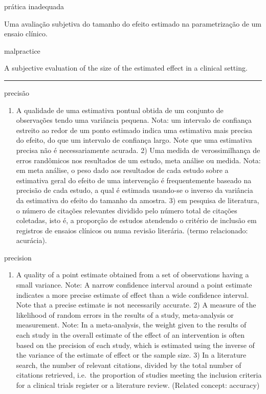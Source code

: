 \documentclass[
  openany]{book}
\providecommand{\tightlist}{%
  \setlength{\itemsep}{0pt}\setlength{\parskip}{0pt}}
\begin{document}
prática inadequada

Uma avaliação subjetiva do tamanho do efeito estimado na parametrização de um ensaio clínico.

malpractice

A subjective evaluation of the size of the estimated effect in a clinical setting.

\begin{center}\rule{0.5\linewidth}{0.5pt}\end{center}

precisão

\begin{enumerate}
\def\labelenumi{\arabic{enumi})}
\tightlist
\item
  A qualidade de uma estimativa pontual obtida de um conjunto de observações tendo uma variância pequena. Nota: um intervalo de confiança estreito ao redor de um ponto estimado indica uma estimativa mais precisa do efeito, do que um intervalo de confiança largo. Note que uma estimativa precisa não é necessariamente acurada. 2) Uma medida de verossimilhança de erros randômicos nos resultados de um estudo, meta análise ou medida. Nota: em meta análise, o peso dado aos resultados de cada estudo sobre a estimativa geral do efeito de uma intervenção é frequentemente baseado na precisão de cada estudo, a qual é estimada usando-se o inverso da variância da estimativa do efeito do tamanho da amostra. 3) em pesquisa de literatura, o número de citações relevantes dividido pelo número total de citações coletadas, isto é, a proporção de estudos atendendo o critério de inclusão em registros de ensaios clínicos ou numa revisão literária. (termo relacionado: acurácia).
\end{enumerate}

precision

\begin{enumerate}
\def\labelenumi{\arabic{enumi})}
\tightlist
\item
  A quality of a point estimate obtained from a set of observations having a small variance. Note: A narrow confidence interval around a point estimate indicates a more precise estimate of effect than a wide confidence interval. Note that a precise estimate is not necessarily accurate. 2) A measure of the likelihood of random errors in the results of a study, meta-analysis or measurement. Note: In a meta-analysis, the weight given to the results of each study in the overall estimate of the effect of an intervention is often based on the precision of each study, which is estimated using the inverse of the variance of the estimate of effect or the sample size. 3) In a literature search, the number of relevant citations, divided by the total number of citations retrieved, i.e.~the proportion of studies meeting the inclusion criteria for a clinical trials register or a literature review. (Related concept: accuracy)
\end{enumerate}
\end{document}
